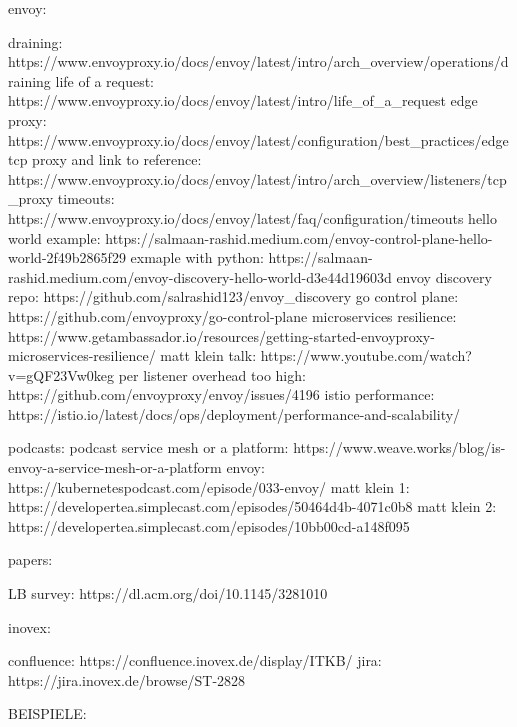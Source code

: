 envoy:

draining: https://www.envoyproxy.io/docs/envoy/latest/intro/arch_overview/operations/draining
life of a request: https://www.envoyproxy.io/docs/envoy/latest/intro/life_of_a_request
edge proxy: https://www.envoyproxy.io/docs/envoy/latest/configuration/best_practices/edge
tcp proxy and link to reference: https://www.envoyproxy.io/docs/envoy/latest/intro/arch_overview/listeners/tcp_proxy
timeouts: https://www.envoyproxy.io/docs/envoy/latest/faq/configuration/timeouts
hello world example: https://salmaan-rashid.medium.com/envoy-control-plane-hello-world-2f49b2865f29
exmaple with python: https://salmaan-rashid.medium.com/envoy-discovery-hello-world-d3e44d19603d
envoy discovery repo: https://github.com/salrashid123/envoy_discovery
go control plane: https://github.com/envoyproxy/go-control-plane
microservices resilience: https://www.getambassador.io/resources/getting-started-envoyproxy-microservices-resilience/
matt klein talk: https://www.youtube.com/watch?v=gQF23Vw0keg
per listener overhead too high: https://github.com/envoyproxy/envoy/issues/4196
istio performance: https://istio.io/latest/docs/ops/deployment/performance-and-scalability/

podcasts:
podcast service mesh or a platform: https://www.weave.works/blog/is-envoy-a-service-mesh-or-a-platform
envoy: https://kubernetespodcast.com/episode/033-envoy/
matt klein 1: https://developertea.simplecast.com/episodes/50464d4b-4071c0b8
matt klein 2: https://developertea.simplecast.com/episodes/10bb00cd-a148f095

papers:

LB survey: https://dl.acm.org/doi/10.1145/3281010

inovex:

confluence: https://confluence.inovex.de/display/ITKB/%
jira: https://jira.inovex.de/browse/ST-2828

BEISPIELE:


